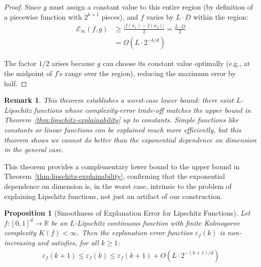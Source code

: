 \documentclass[11pt,letter,leqno]{article}
\newtheorem{proposition}[theorem]{Proposition}
\newtheorem{remark}[theorem]{Remark}
\begin{document}
\begin{proof}
Since $g$ must assign a constant value to this entire region (by definition of a piecewise function with $2^{k+1}$ pieces), and $f$ varies by $L \cdot D$ within the region:
\begin{align}
\mathcal{E}_{\infty}(f, g) &\geq \frac{|f(x_1) - f(x_2)|}{2} = \frac{L \cdot D}{2}\\
&= \Omega\left(L \cdot 2^{-k/d}\right)
\end{align}

The factor $1/2$ arises because $g$ can choose its constant value optimally (e.g., at the midpoint of $f$'s range over the region), reducing the maximum error by half.
\end{proof}

\begin{remark}
This theorem establishes a worst-case lower bound: there exist $L$-Lipschitz functions whose complexity-error trade-off matches the upper bound in Theorem~\ref{thm:lipschitz-explainability} up to constants. Simple functions like constants or linear functions can be explained much more efficiently, but this theorem shows we cannot do better than the exponential dependence on dimension in the general case.
\end{remark}

This theorem provides a complementary lower bound to the upper bound in Theorem~\ref{thm:lipschitz-explainability}, confirming that the exponential dependence on dimension is, in the worst case, intrinsic to the problem of explaining Lipschitz functions, not just an artifact of our construction.

\begin{proposition}[Smoothness of Explanation Error for Lipschitz Functions]
\label{prop:error-smoothness}
Let $f: [0,1]^d \to \mathbb{R}$ be an $L$-Lipschitz continuous function with finite Kolmogorov complexity $K(f) < \infty$. Then the explanation error function $\varepsilon_f(k)$ is non-increasing and satisfies, for all $k \geq 1$:
\begin{align}
\varepsilon_f(k+1) \leq \varepsilon_f(k) \leq \varepsilon_f(k+1) + O\left(L \cdot 2^{-(k+1)/d}\right)
\end{align}
\end{proposition}
\end{document}
